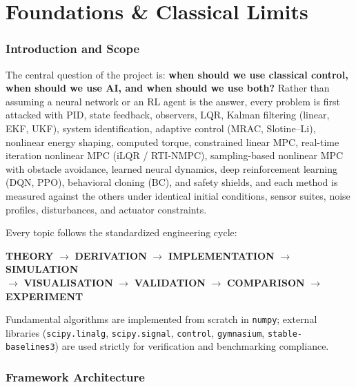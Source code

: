 \documentclass[11pt,a4paper]{article}
\begin{document}
\part{Foundations \& Classical Limits}

\section{Introduction and Scope}

The central question of the project is: \textbf{when should we use classical
control, when should we use AI, and when should we use both?} Rather than
assuming a neural network or an RL agent is the answer, every problem is first
attacked with PID, state feedback, observers, LQR, Kalman filtering (linear, EKF, UKF),
system identification, adaptive control (MRAC, Slotine--Li), nonlinear energy shaping,
computed torque, constrained linear MPC, real-time iteration nonlinear MPC (iLQR / RTI-NMPC),
sampling-based nonlinear MPC with obstacle avoidance, learned neural dynamics, deep
reinforcement learning (DQN, PPO), behavioral cloning (BC), and safety shields, and each method is measured
against the others under identical initial conditions, sensor suites, noise profiles,
disturbances, and actuator constraints.

Every topic follows the standardized engineering cycle:
\begin{center}
\textbf{THEORY} $\longrightarrow$ \textbf{DERIVATION} $\longrightarrow$ \textbf{IMPLEMENTATION} $\longrightarrow$ \textbf{SIMULATION}\\
$\longrightarrow$ \textbf{VISUALISATION} $\longrightarrow$ \textbf{VALIDATION} $\longrightarrow$ \textbf{COMPARISON} $\longrightarrow$ \textbf{EXPERIMENT}
\end{center}

Fundamental algorithms are implemented from scratch in \texttt{numpy}; external
libraries (\texttt{scipy.linalg}, \texttt{scipy.signal}, \texttt{control}, \texttt{gymnasium},
\texttt{stable-baselines3}) are used strictly for verification and benchmarking compliance.

\section{Framework Architecture}
\end{document}
